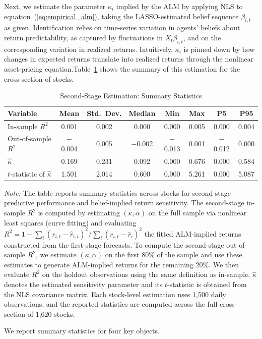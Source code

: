 \documentclass[11pt]{article}
\begin{document}
Next, we estimate the parameter $\kappa_{i}$ implied by the ALM by applying NLS to equation~(\ref{eq:empirical_alm}), taking the LASSO-estimated belief sequence ${\beta_{i,t}}$ as given.
Identification relies on time-series variation in agents’ beliefs about return predictability, as captured by fluctuations in $X_t \beta_{i,t}$, and on the corresponding variation in realized returns. 
Intuitively, $\kappa_{i}$ is pinned down by how changes in expected returns translate into realized returns through the nonlinear asset-pricing equation.Table~\ref{tab:summary_stats_stage2} shows the summary of this estimation for the cross-section of stocks.
\begin{table}[H]
\centering
\caption{Second-Stage Estimation: Summary Statistics}
\label{tab:summary_stats_stage2}

\begin{tabularx}{\textwidth}{@{}>{\small}Xccccccc@{}}
\toprule
Variable & Mean & Std.\ Dev. & Median & Min & Max & P5 & P95 \\
\midrule
In-sample $R^2$ 
& 0.001 & 0.002 & 0.000 & 0.000 & 0.005 & 0.000 & 0.004 \\

Out-of-sample $R^2$
& $-$0.004 & 0.005 & $-$0.002 & $-$0.013 & 0.001 & $-$0.012 & 0.000 \\

$\hat{\kappa}$
& 0.169 & 0.231 & 0.092 & 0.000 & 0.676 & 0.000 & 0.584 \\

$t$-statistic of $\hat{\kappa}$
& 1.501 & 2.014 & 0.600 & 0.000 & 5.261 & 0.000 & 5.087 \\
\bottomrule
\end{tabularx}

\medskip
\begin{minipage}{\textwidth}
\footnotesize
\textit{Note:} The table reports summary statistics across stocks for second-stage
predictive performance and belief-implied return sensitivity.
The second-stage in-sample $R^2$ is computed by estimating $(\kappa,\alpha)$ on the
full sample via nonlinear least squares (curve fitting) and evaluating
$R^2 = 1-\sum_t (r_{i,t}-\hat r_{i,t})^2 \Big/ \sum_t (r_{i,t}-\bar r_i)^2$
the fitted ALM-implied returns constructed from the first-stage forecasts.
To compute the second-stage out-of-sample $R^2$, we estimate $(\kappa,\alpha)$ on the first 80\% of the sample and use these estimates to generate ALM-implied returns for the remaining 20\%. 
We then evaluate $R^2$ on the holdout observations using the same definition as in-sample.
$\hat{\kappa}$ denotes the estimated sensitivity parameter and its $t$-statistic
is obtained from the NLS covariance matrix.
Each stock-level estimation uses 1{,}500 daily observations, and the reported statistics are computed across the
full cross-section of 1{,}620 stocks.
\end{minipage}
\end{table}
We report summary statistics for four key objects.
\end{document}
